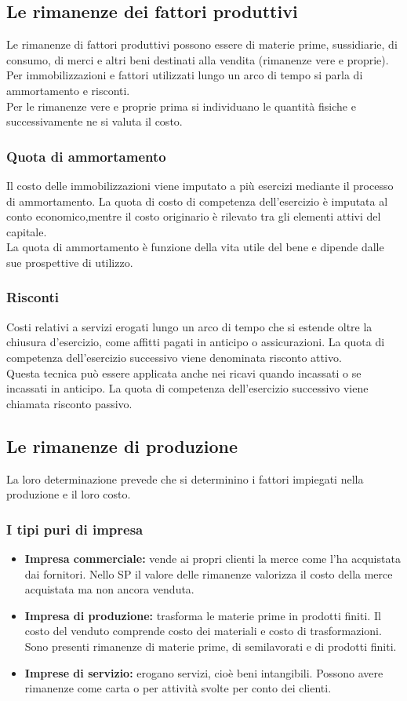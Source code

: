 \documentclass{report}
\begin{document}
	\subsection{Le rimanenze dei fattori produttivi}
	Le rimanenze di fattori produttivi possono essere di materie prime, sussidiarie, di consumo, di merci e altri beni destinati alla vendita (rimanenze vere e proprie). Per immobilizzazioni e fattori utilizzati lungo un arco di tempo si parla di ammortamento e risconti.\medskip \\Per le rimanenze vere e proprie prima si individuano le quantità fisiche e successivamente ne si valuta il costo.
	\subsubsection{Quota di ammortamento}
	Il costo delle immobilizzazioni viene imputato a più esercizi mediante il processo di ammortamento. La quota di costo di competenza dell'esercizio è imputata al conto economico,mentre il costo originario è rilevato tra gli elementi attivi del capitale.
	\medskip \\La quota di ammortamento è funzione della vita utile del bene e dipende dalle sue prospettive di utilizzo.
	\subsubsection{Risconti}
	Costi relativi a servizi erogati lungo un arco di tempo che si estende oltre la chiusura d'esercizio, come affitti pagati in anticipo o assicurazioni. La quota di competenza dell'esercizio successivo viene denominata risconto attivo.\medskip \\Questa tecnica può essere applicata anche nei ricavi quando incassati o se incassati in anticipo. La quota di competenza dell'esercizio successivo viene chiamata risconto passivo.
	\subsection{Le rimanenze di produzione}
	La loro determinazione prevede che si determinino i fattori impiegati nella produzione e il loro costo.
	\subsubsection{I tipi puri di impresa}
	\begin{itemize}
		\item \textbf{Impresa commerciale:} vende ai propri clienti la merce come l'ha acquistata dai fornitori. Nello SP il valore delle rimanenze valorizza il costo della merce acquistata ma non ancora venduta.
		\item \textbf{Impresa di produzione:} trasforma le materie prime in prodotti finiti. Il costo del venduto comprende costo dei materiali e costo di trasformazioni. Sono presenti rimanenze di materie prime, di semilavorati e di prodotti finiti.
		\item \textbf{Imprese di servizio:} erogano servizi, cioè beni intangibili. Possono avere rimanenze come carta o per attività svolte per conto dei clienti.
	\end{itemize}
\end{document}

